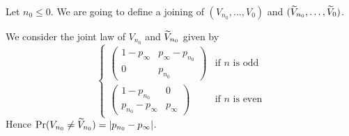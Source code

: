 \documentclass[12pt,a4paper]{article}
\begin{document}
Let $n_0 \leq 0$. We are going to define a joining of $(V_{n_0}, \ldots, V_0)$ and 
$(\widetilde{V}_{n_0}, \ldots, \widetilde{V}_0)$.

We consider the joint law of $V_{n_0}$ and $\widetilde{V}_{n_0}$ given by
$$
\begin{cases}
\begin{pmatrix} 
1-p_\infty &  p_\infty - p_{n_0} \\
0 & p_{n_0}
\end{pmatrix} & \text{if $n$ is odd} \\
\begin{pmatrix} 
1-p_{n_0}  &  0 \\
p_{n_0} - p_\infty  & p_\infty
\end{pmatrix} & \text{if $n$ is even}
\end{cases}
$$
Hence $\Pr(V_{n_0} \neq \widetilde{V}_{n_0}) = |p_{n_0}-p_\infty|$.
\end{document}
